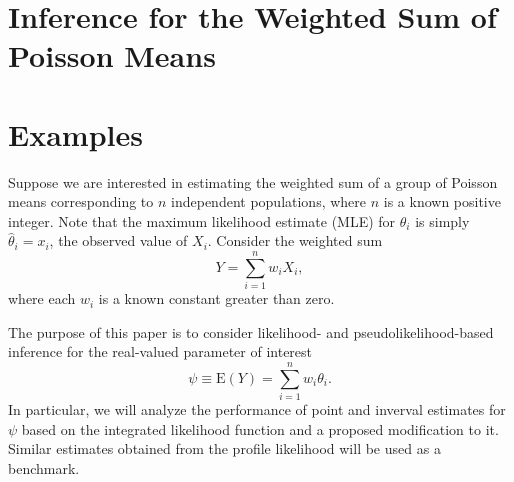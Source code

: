 \documentclass[
  12pt]{article}
\begin{document}
\section{Inference for the Weighted Sum of Poisson
Means}\label{inference-for-the-weighted-sum-of-poisson-means}

\section{Examples}\label{examples}

Suppose we are interested in estimating the weighted sum of a group of
Poisson means corresponding to \(n\) independent populations, where
\(n\) is a known positive integer. Note that the maximum likelihood
estimate (MLE) for \(\theta_i\) is simply \(\hat{\theta}_i = x_i\), the
observed value of \(X_i\). Consider the weighted sum
\[Y = \sum_{i=1}^n w_iX_i,\] where each \(w_i\) is a known constant
greater than zero.

The purpose of this paper is to consider likelihood- and
pseudolikelihood-based inference for the real-valued parameter of
interest \[\psi \equiv \text{E}(Y) = \sum_{i=1}^n w_i\theta_i.\] In
particular, we will analyze the performance of point and inverval
estimates for \(\psi\) based on the integrated likelihood function and a
proposed modification to it. Similar estimates obtained from the profile
likelihood will be used as a benchmark.


  
\end{document}
